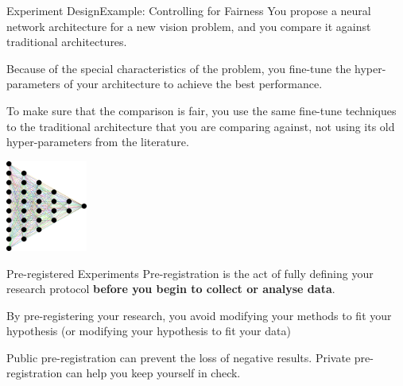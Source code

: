 \documentclass{beamer}
\begin{document}
\begin{CJK}{UTF8}{ipxm}
\begin{frame}{Experiment Design}{Example: Controlling for Fairness}
  You propose a neural network architecture for a new vision problem, and you compare it against traditional architectures.\bigskip

  Because of the special characteristics of the problem, you fine-tune the hyper-parameters of your architecture to achieve the best performance.\bigskip

  To make sure that the comparison is fair, you use the same fine-tune techniques to the traditional architecture that you are comparing against, not using its old hyper-parameters from the literature.

  \hfill\includegraphics[width=0.2\textwidth]{../img/pixabay_neuralnetwork_gordonjohnson}
\end{frame}

\begin{frame}{Pre-registered Experiments}
  Pre-registration is the act of fully defining your research protocol {\bf before you begin to collect or analyse data}.
  \bigskip

  By pre-registering your research, you avoid modifying your methods to fit your hypothesis (or modifying your hypothesis to fit your data)
  \bigskip

  Public pre-registration can prevent the loss of negative results. Private pre-registration can help you keep yourself in check.\bigskip


\end{frame}
\end{CJK}
\end{document}
